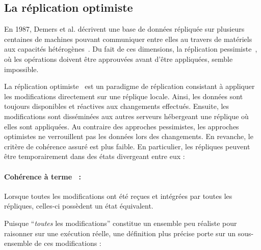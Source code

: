 
\subsection{La réplication optimiste}
\label{repl:subsec:optimistic}

En 1987, Demers et al. décrivent une base de données répliquée sur plusieurs
centaines de machines pouvant communiquer entre elles au travers de matériels
aux capacités hétérogènes~\cite{demers1987epidemic}. Du fait de ces dimensions,
la réplication pessimiste~\cite{alsberg1976principle, gifford1979weighted}, où
les opérations doivent être approuvées avant d'être appliquées, semble
impossible.

La réplication optimiste~\cite{demers1987epidemic, johnson1975maintenance,
  ladin1992providing, saito2005optimistic} est un paradigme de réplication
consistant à appliquer les modifications directement sur une réplique locale.
Ainsi, les données sont toujours disponibles et réactives aux changements
effectués. Ensuite, les modifications sont disséminées aux autres serveurs
hébergeant une réplique où elles sont appliquées. Au contraire des approches
pessimistes, les approches optimistes ne verrouillent pas les données lors des
changements. En revanche, le critère de cohérence assuré est plus faible. En
particulier, les répliques peuvent être temporairement dans des états
divergeant entre eux :


\paragraph{Cohérence à terme~\cite{bailis2013eventual} :} Lorsque toutes les
modifications ont été reçues et intégrées par toutes les répliques, celles-ci
possèdent un état équivalent.

\noindent Puisque ``\emph{toutes} les modifications'' constitue un ensemble peu
réaliste pour raisonner sur une exécution réelle, une définition plus précise
porte sur un sous-ensemble de ces modifications :

